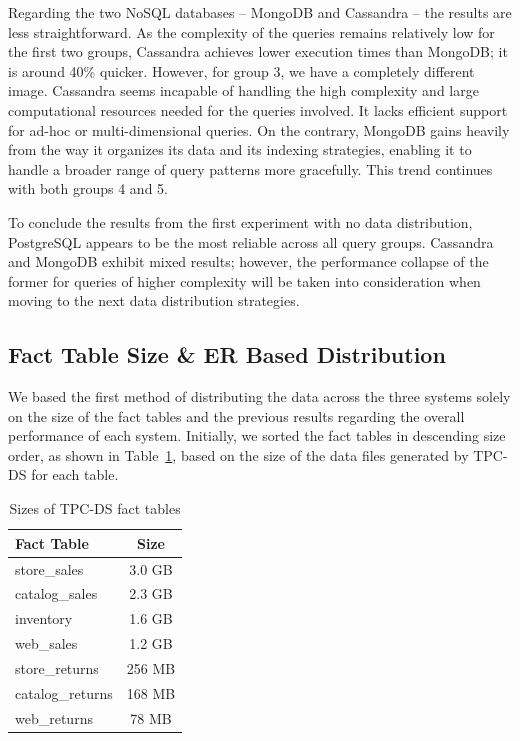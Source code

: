 \documentclass[conference]{IEEEtran}
\begin{document}
Regarding the two NoSQL databases – MongoDB and Cassandra – the results are less straightforward. As the complexity of the queries remains relatively low for the first two groups, Cassandra achieves lower execution times than MongoDB; it is around 40\% quicker. However, for group 3, we have a completely different image. Cassandra seems incapable of handling the high complexity and large computational resources needed for the queries involved. It lacks efficient support for ad-hoc or multi-dimensional queries. On the contrary, MongoDB gains heavily from the way it organizes its data and its indexing strategies, enabling it to handle a broader range of query patterns more gracefully. This trend continues with both groups 4 and 5.

To conclude the results from the first experiment with no data distribution, PostgreSQL appears to be the most reliable across all query groups. Cassandra and MongoDB exhibit mixed results; however, the performance collapse of the former for queries of higher complexity will be taken into consideration when moving to the next data distribution strategies.

\subsection{Fact Table Size \& ER Based Distribution}

We based the first method of distributing the data across the three systems solely on the size of the fact tables and the previous results regarding the overall performance of each system. Initially, we sorted the fact tables in descending size order, as shown in Table~\ref{tab:fact_table_sizes}, based on the size of the data files generated by TPC-DS for each table.

\begin{table}[htbp]
    \centering
    \renewcommand{\arraystretch}{1.2}
    \caption{Sizes of TPC-DS fact tables}
    \begin{tabular}{|l|c|}
        \hline
        \textbf{Fact Table} & \textbf{Size} \\
        \hline
        store\_sales        & 3.0 GB        \\
        catalog\_sales      & 2.3 GB        \\
        inventory           & 1.6 GB        \\
        web\_sales          & 1.2 GB        \\
        store\_returns      & 256 MB        \\
        catalog\_returns    & 168 MB        \\
        web\_returns        & 78 MB         \\
        \hline
    \end{tabular}
    \label{tab:fact_table_sizes}
\end{table}
\end{document}
